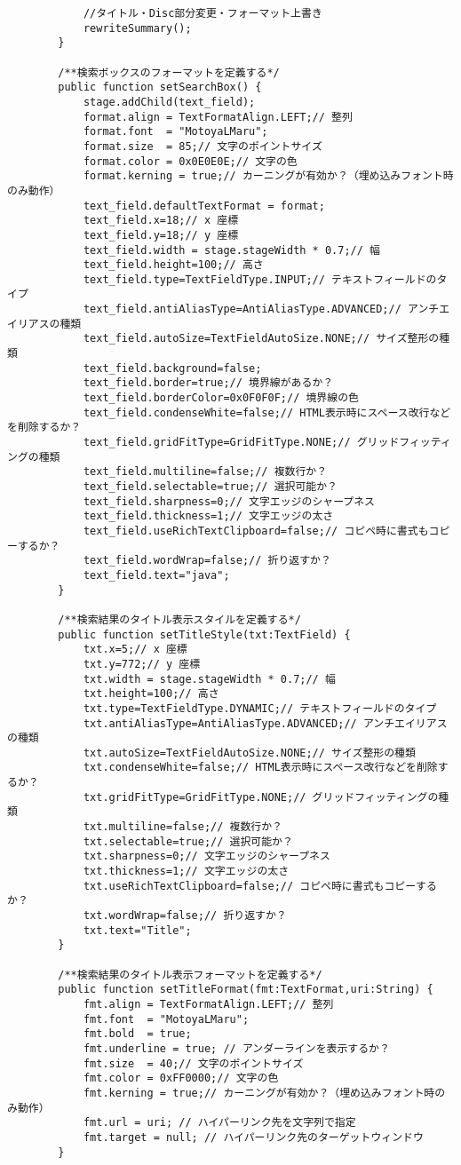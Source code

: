 {\begin{verbatim}
			//タイトル・Disc部分変更・フォーマット上書き
			rewriteSummary();
		}

		/**検索ボックスのフォーマットを定義する*/
		public function setSearchBox() {
			stage.addChild(text_field);
			format.align = TextFormatAlign.LEFT;// 整列
			format.font  = "MotoyaLMaru";
			format.size  = 85;// 文字のポイントサイズ
			format.color = 0x0E0E0E;// 文字の色
			format.kerning = true;// カーニングが有効か？（埋め込みフォント時のみ動作）
			text_field.defaultTextFormat = format;
			text_field.x=18;// x 座標
			text_field.y=18;// y 座標
			text_field.width = stage.stageWidth * 0.7;// 幅
			text_field.height=100;// 高さ
			text_field.type=TextFieldType.INPUT;// テキストフィールドのタイプ
			text_field.antiAliasType=AntiAliasType.ADVANCED;// アンチエイリアスの種類
			text_field.autoSize=TextFieldAutoSize.NONE;// サイズ整形の種類
			text_field.background=false;
			text_field.border=true;// 境界線があるか？
			text_field.borderColor=0x0F0F0F;// 境界線の色
			text_field.condenseWhite=false;// HTML表示時にスペース改行などを削除するか？
			text_field.gridFitType=GridFitType.NONE;// グリッドフィッティングの種類
			text_field.multiline=false;// 複数行か？
			text_field.selectable=true;// 選択可能か？
			text_field.sharpness=0;// 文字エッジのシャープネス
			text_field.thickness=1;// 文字エッジの太さ
			text_field.useRichTextClipboard=false;// コピペ時に書式もコピーするか？
			text_field.wordWrap=false;// 折り返すか？
			text_field.text="java";
		}
		
		/**検索結果のタイトル表示スタイルを定義する*/
		public function setTitleStyle(txt:TextField) {
			txt.x=5;// x 座標
			txt.y=772;// y 座標
			txt.width = stage.stageWidth * 0.7;// 幅
			txt.height=100;// 高さ
			txt.type=TextFieldType.DYNAMIC;// テキストフィールドのタイプ
			txt.antiAliasType=AntiAliasType.ADVANCED;// アンチエイリアスの種類
			txt.autoSize=TextFieldAutoSize.NONE;// サイズ整形の種類
			txt.condenseWhite=false;// HTML表示時にスペース改行などを削除するか？
			txt.gridFitType=GridFitType.NONE;// グリッドフィッティングの種類
			txt.multiline=false;// 複数行か？
			txt.selectable=true;// 選択可能か？
			txt.sharpness=0;// 文字エッジのシャープネス
			txt.thickness=1;// 文字エッジの太さ
			txt.useRichTextClipboard=false;// コピペ時に書式もコピーするか？
			txt.wordWrap=false;// 折り返すか？
			txt.text="Title";
		}
		
		/**検索結果のタイトル表示フォーマットを定義する*/
		public function setTitleFormat(fmt:TextFormat,uri:String) {
			fmt.align = TextFormatAlign.LEFT;// 整列
			fmt.font  = "MotoyaLMaru";
			fmt.bold  = true;
			fmt.underline = true; // アンダーラインを表示するか？
			fmt.size  = 40;// 文字のポイントサイズ
			fmt.color = 0xFF0000;// 文字の色
			fmt.kerning = true;// カーニングが有効か？（埋め込みフォント時のみ動作）
			fmt.url = uri; // ハイパーリンク先を文字列で指定
			fmt.target = null; // ハイパーリンク先のターゲットウィンドウ
		}
		

\end{verbatim}}
